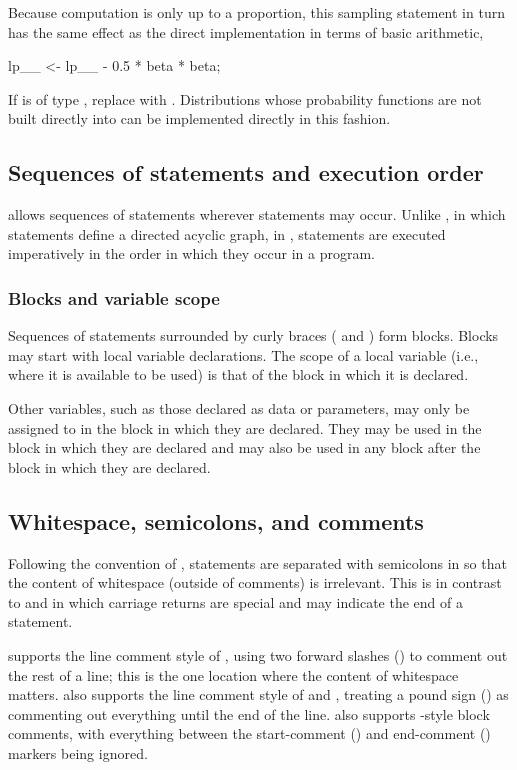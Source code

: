 \documentclass[article]{jss}
\begin{document}
Because computation is only up to a proportion, this sampling
statement in turn has the same effect as the direct implementation in
terms of basic arithmetic,
%
\begin{Code}
lp__ <- lp__ - 0.5 * beta * beta;
\end{Code}
%
If  is of type , replace 
with .  Distributions whose probability functions
are not built directly into  can be implemented
directly in this fashion.

\subsection{Sequences of statements and execution order}

 allows sequences of statements wherever statements may
occur. Unlike , in which statements define a directed
acyclic graph, in , statements are executed
imperatively in the order in which they occur in a program.

\subsubsection{Blocks and variable scope}

Sequences of statements surrounded by curly braces (\code{\{} and
\code{\}}) form blocks.  Blocks may start with local variable
declarations.  The scope of a local variable (i.e., where it is
available to be used) is that of the block in which it is declared.

Other variables, such as those declared as data or parameters, may
only be assigned to in the block in which they are declared.  They may
be used in the block in which they are declared and may also be used
in any block after the block in which they are declared.


\subsection{Whitespace, semicolons, and comments}

Following the convention of , statements are separated
with semicolons in  so that the content of whitespace
(outside of comments) is irrelevant.  This is in contrast to
 and  in which carriage returns are
special and may indicate the end of a statement.

 supports the line comment style of ,
using two forward slashes (\code{//}) to comment out the rest of a
line; this is the one location where the content of whitespace
matters.   also supports the line comment style of  and
, treating a pound sign (\code{\#}) as commenting out
everything until the end of the line.   also supports
-style block comments, with everything between the
start-comment (\code{/*}) and end-comment (\code{*/}) markers being
ignored. 
\end{document}
